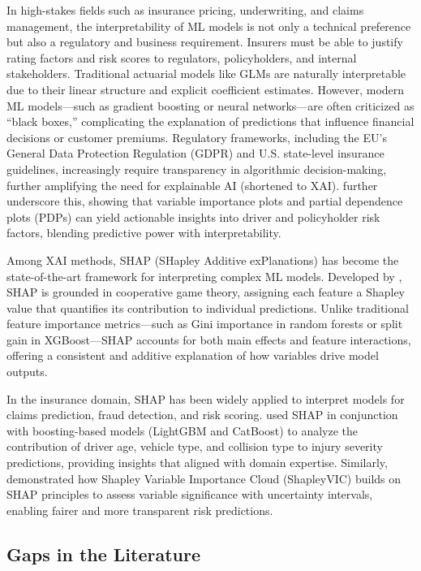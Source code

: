 \documentclass[
  number,
  review,
  3p]{elsarticle}
\begin{document}
In high-stakes fields such as insurance pricing, underwriting, and
claims management, the interpretability of ML models is not only a
technical preference but also a regulatory and business requirement.
Insurers must be able to justify rating factors and risk scores to
regulators, policyholders, and internal stakeholders. Traditional
actuarial models like GLMs are naturally interpretable due to their
linear structure and explicit coefficient estimates. However, modern ML
models---such as gradient boosting or neural networks---are often
criticized as ``black boxes,'' complicating the explanation of
predictions that influence financial decisions or customer premiums.
Regulatory frameworks, including the EU's General Data Protection
Regulation (GDPR) and U.S. state-level insurance guidelines,
increasingly require transparency in algorithmic decision-making,
further amplifying the need for explainable AI (shortened to XAI).
\citet{henckaerts} further underscore this, showing that variable
importance plots and partial dependence plots (PDPs) can yield
actionable insights into driver and policyholder risk factors, blending
predictive power with interpretability.

Among XAI methods, SHAP (SHapley Additive exPlanations) has become the
state-of-the-art framework for interpreting complex ML models. Developed
by \citet{lundberg}, SHAP is grounded in cooperative game theory,
assigning each feature a Shapley value that quantifies its contribution
to individual predictions. Unlike traditional feature importance
metrics---such as Gini importance in random forests or split gain in
XGBoost---SHAP accounts for both main effects and feature interactions,
offering a consistent and additive explanation of how variables drive
model outputs.

In the insurance domain, SHAP has been widely applied to interpret
models for claims prediction, fraud detection, and risk scoring.
\citet{dong} used SHAP in conjunction with boosting-based models
(LightGBM and CatBoost) to analyze the contribution of driver age,
vehicle type, and collision type to injury severity predictions,
providing insights that aligned with domain expertise. Similarly,
\citet{ning} demonstrated how Shapley Variable Importance Cloud
(ShapleyVIC) builds on SHAP principles to assess variable significance
with uncertainty intervals, enabling fairer and more transparent risk
predictions.

\subsection{\texorpdfstring{\textbf{Gaps in the
Literature}}{Gaps in the Literature}}\label{gaps-in-the-literature}
\end{document}
